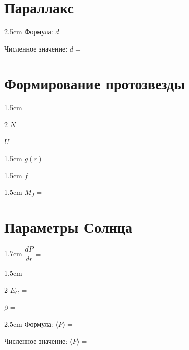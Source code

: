 
\part{Параллакс}

\begin{answerbox}{2.5cm}
Формула: \(d=\)

\bigskip

Численное значение: \(d=\)
\end{answerbox}

\part{Формирование протозвезды}

\begin{answerbox}{1.5cm}
\begin{multicols}{2}
\(N=\)

\columnbreak

\(U=\)
\end{multicols}
\end{answerbox}

\begin{answerbox}{1.5cm}
\(g(r)=\)
\end{answerbox}

\begin{answerbox}{1.5cm}
\(f=\)
\end{answerbox}

\begin{answerbox}{1.5cm}
\(M_J=\)
\end{answerbox}

\part{Параметры Солнца}

\begin{answerbox}{1.7cm}
\(\dfrac{dP}{dr}=\)
\end{answerbox}

\begin{answerbox}{1.5cm}
\begin{multicols}{2}
\(E_G=\)

\columnbreak

\(\beta=\)
\end{multicols}
\end{answerbox}

\begin{answerbox}{2.5cm}
Формула: \(\langle P\rangle=\)

\bigskip

Численное значение: \(\langle P\rangle=\)
\end{answerbox}

